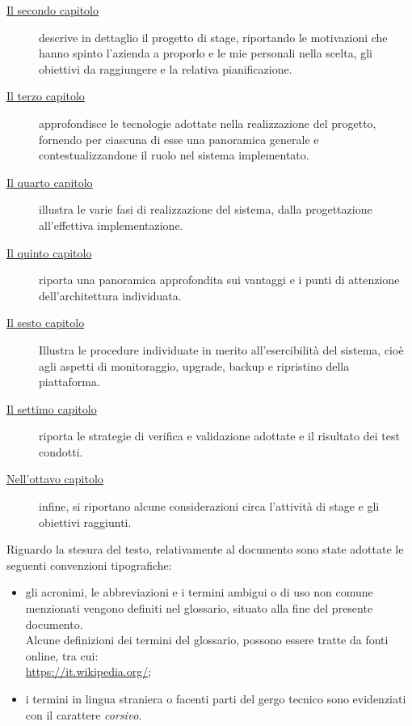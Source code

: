 \begin{description}
    
    \item[{\hyperref[cap:lo-stage]{Il secondo capitolo}}] descrive in dettaglio il progetto di stage, riportando le motivazioni che hanno spinto l'azienda a proporlo e le mie personali nella scelta, gli obiettivi da raggiungere e la relativa pianificazione.
    
    \item[{\hyperref[cap:tecnologie-adottate]{Il terzo capitolo}}] approfondisce le tecnologie adottate nella realizzazione del progetto, fornendo per ciascuna di esse una panoramica generale e contestualizzandone il ruolo nel sistema implementato.
    
    \item[{\hyperref[cap:realizzazione-del-sistema]{Il quarto capitolo}}] illustra le varie fasi di realizzazione del sistema, dalla progettazione all'effettiva implementazione.
    
    \item[{\hyperref[cap:vantaggi-e-punti-di-attenzione]{Il quinto capitolo}}]riporta una panoramica approfondita sui vantaggi e i punti di attenzione dell'architettura individuata.
    
    \item[{\hyperref[cap:esercibilità]{Il sesto capitolo}}]Illustra le procedure individuate in merito all'esercibilità del sistema, cioè agli aspetti di monitoraggio, upgrade, backup e ripristino della piattaforma.
        
    \item[{\hyperref[cap:verifica-validazione]{Il settimo capitolo}}] riporta le strategie di verifica e validazione adottate e il risultato dei test condotti.
    
    \item[{\hyperref[cap:conclusioni]{Nell'ottavo capitolo}}] infine, si riportano alcune considerazioni circa l'attività di stage e gli obiettivi raggiunti.
\end{description}

Riguardo la stesura del testo, relativamente al documento sono state adottate le seguenti convenzioni tipografiche:
\begin{itemize}
	\item gli acronimi, le abbreviazioni e i termini ambigui o di uso non comune menzionati vengono definiti nel glossario, situato alla fine del presente documento. \\
    Alcune definizioni dei termini del glossario, possono essere tratte da fonti online, tra cui: \\ 
    \url{https://it.wikipedia.org/};
	\item i termini in lingua straniera o facenti parti del gergo tecnico sono evidenziati con il carattere \emph{corsivo}.
\end{itemize}